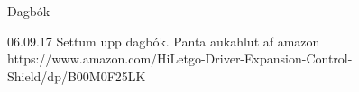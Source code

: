 Dagbók

06.09.17
Settum upp dagbók. Panta aukahlut af amazon https://www.amazon.com/HiLetgo-Driver-Expansion-Control-Shield/dp/B00M0F25LK
